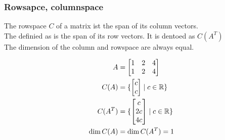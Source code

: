 \subsubsection{Rowsapce, columnspace}
The rowspace \( C \) of a matrix ist the span of its column vectors. \\
The definied as is the span of its row vectors. It is dentoed as \( C(A^T) \)\\
The dimension of the column and rowspace are always equal.
\begin{example}
    \begin{align*}
        A         & = \begin{bmatrix}
            1 & 2 & 4 \\ 1 & 2 & 4
        \end{bmatrix}      \\
        C(A)      & = \{
        \begin{bmatrix}
                c \\ c
            \end{bmatrix} \mid c \in \mathbb{R} \} \\
        C(A^T)    & = \{
        \begin{bmatrix}
                c \\ 2c \\ 4c
            \end{bmatrix} \mid c \in \mathbb{R} \} \\
        \dim C(A) & = \dim C(A^T) = 1                 \\
    \end{align*}
\end{example}
